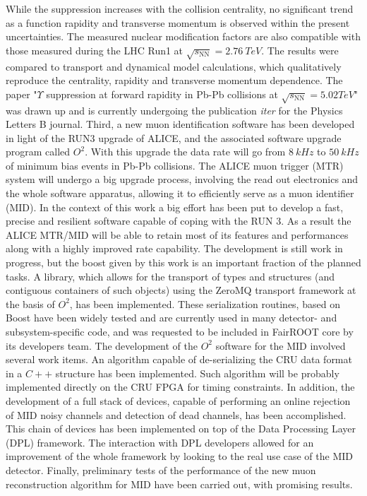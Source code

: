 While the suppression increases with the collision centrality, no significant trend as a function rapidity and transverse momentum is observed within the present uncertainties. 
The measured nuclear modification factors are also compatible with those measured during the LHC Run1 at $\sqrt{s_{\mathrm{NN}}}=2.76\ TeV$.
The results were compared to transport and dynamical model calculations, which qualitatively reproduce the centrality, rapidity and transverse momentum dependence.
The paper "$\Upsilon$ suppression at forward rapidity in Pb-Pb collisions at $\sqrt{s_{\mathrm{NN}}} = 5.02 TeV$"\cite{MINE} was drawn up and is currently undergoing the publication \textit{iter} for the Physics Letters B journal.
Third, a new muon identification software has been developed in light of the RUN3 upgrade of ALICE, and the associated software upgrade program called $O^2$.
With this upgrade the data rate will go from $8\ kHz$ to $50\ kHz$ of minimum bias events in Pb-Pb collisions.
The ALICE muon trigger (MTR) system will undergo a big upgrade process, involving the read out electronics and the whole software apparatus, allowing it to efficiently serve as a muon identifier (MID).
In the context of this work a big effort has been put to develop a fast, precise and resilient software capable of coping with the RUN 3. 
As a result the ALICE MTR/MID will be able to retain most of its features and performances along with a highly improved rate capability. 
The development is still work in progress, but the boost given by this work is an important fraction of the planned tasks.
A library, which allows for the transport of  types and structures (and contiguous containers of such objects) using the ZeroMQ transport framework at the basis of $O^2$, has been implemented.
These serialization routines, based on Boost have been widely tested and are currently used in many detector- and subsystem-specific code, and was requested to be included in FairROOT core by its developers team. 
The development of the $O^2$ software for the MID involved several work items.
An algorithm capable of de-serializing the CRU data format in a $C++$ structure has been implemented.
Such algorithm will be probably implemented directly on the CRU FPGA for timing constraints.
In addition, the development of a full stack of devices, capable of performing an online rejection of MID noisy channels and detection of dead channels, has been accomplished.
This chain of devices has been implemented on top of the Data Processing Layer (DPL) framework.
The interaction with DPL developers allowed for an improvement of the whole framework by looking to the real use case of the MID detector.
Finally, preliminary tests of the performance of the new muon reconstruction algorithm for MID have been carried out, with promising results.
